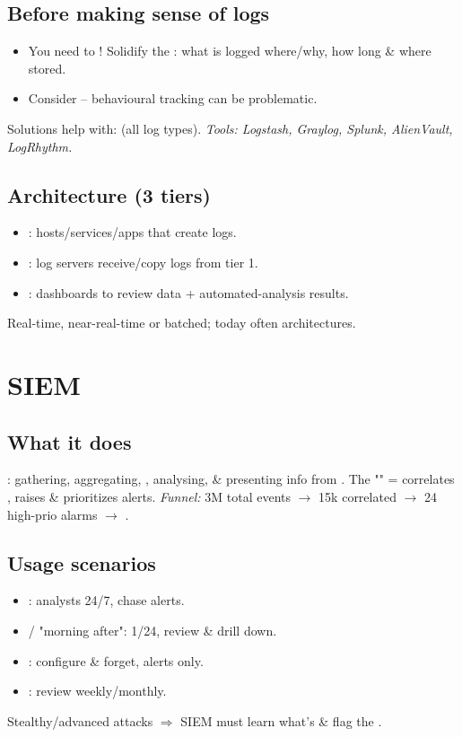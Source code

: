 \subsection{Before making sense of logs}
\begin{itemize}
\item You need to ! Solidify the : what is logged where/why, how long \& where stored.
\item Consider  -- behavioural tracking can be problematic.
\end{itemize}
Solutions help with:  (all log types). \textit{Tools: Logstash, Graylog, Splunk, AlienVault, LogRhythm.}

\subsection{Architecture (3 tiers)}
\begin{itemize}
\item {}: hosts/services/apps that create logs.
\item {}: log servers receive/copy logs from tier 1.
\item {}: dashboards to review data + automated-analysis results.
\end{itemize}
Real-time, near-real-time or batched; today often  architectures.

\section{SIEM}

\subsection{What it does}
: gathering, aggregating, , analysing,  \& presenting info from . The "" = correlates , raises \& prioritizes alerts.
\textit{Funnel:} 3M total events $\to$ 15k correlated $\to$ 24 high-prio alarms $\to$ .

\subsection{Usage scenarios}
\begin{itemize}
\item {}: analysts 24/7, chase alerts.
\item {} / "morning after": 1/24, review \& drill down.
\item {}: configure \& forget, alerts only.
\item {}: review weekly/monthly.
\end{itemize}
Stealthy/advanced attacks $\Rightarrow$ SIEM must learn what's  \& flag the .


